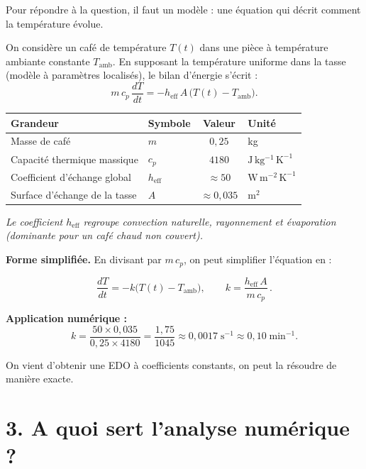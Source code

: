 Pour répondre à la question, il faut un modèle :
une équation qui décrit comment la température évolue.

\medskip

On considère un café de température $T(t)$ dans une pièce à température
ambiante constante $T_{\mathrm{amb}}$.
En supposant la température uniforme dans la tasse
(modèle à paramètres localisés), le bilan d'énergie s'écrit :
\[
  m\,c_p\,\frac{dT}{dt}
  = -h_{\mathrm{eff}}\,A\,\bigl(T(t) - T_{\mathrm{amb}}\bigr).
\]

\begin{center}
\renewcommand{\arraystretch}{1.2}
\begin{tabular}{llcl}
  \hline
  \textbf{Grandeur} & \textbf{Symbole}
    & \textbf{Valeur} & \textbf{Unité} \\
  \hline
  Masse de café
    & $m$ & $0{,}25$ & kg \\
  Capacité thermique massique
    & $c_p$ & $4180$ & $\mathrm{J\,kg^{-1}\,K^{-1}}$ \\
  Coefficient d'échange global
    & $h_{\mathrm{eff}}$ & $\approx 50$
    & $\mathrm{W\,m^{-2}\,K^{-1}}$ \\
  Surface d'échange de la tasse
    & $A$ & $\approx 0{,}035$ & $\mathrm{m}^{2}$ \\
  \hline
\end{tabular}
\end{center}

\smallskip

\textit{Le coefficient $h_{\mathrm{eff}}$ regroupe convection naturelle,
rayonnement et évaporation (dominante pour un café chaud non couvert).}

\medskip

\textbf{Forme simplifiée.} En divisant par $m\,c_p$, on peut simplifier l'équation en :

\[
  \frac{dT}{dt} = -k\bigl(T(t) - T_{\mathrm{amb}}\bigr),
  \qquad k = \frac{h_{\mathrm{eff}}\,A}{m\,c_p}\,.
\]

\textbf{Application numérique :}
\[
  k = \frac{50 \times 0{,}035}{0{,}25 \times 4180}
    = \frac{1{,}75}{1045}
    \approx 0{,}0017\;\mathrm{s^{-1}}
    \approx 0{,}10\;\mathrm{min^{-1}}.
\]

On vient d'obtenir une EDO à coefficients constants, on peut la résoudre de manière exacte.



\section*{3. A quoi sert l'analyse numérique ?}

